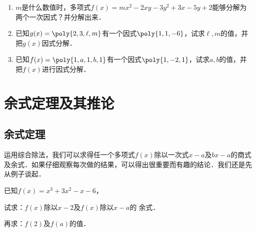 \begin{enumerate}
    \begin{enumerate}
    \item $x^2+3xy+2y^2+4x+5y+3$
\end{enumerate}
    \item $m$是什么数值时，多项式$f(x)=mx^2-2xy-3y^2+3x-5y+2$能够分解为两个一次因式？并分解出来．
    \item 已知$g(x)=\poly{2,3,\ell,m}$有一个因式$\poly{1,1,-6}$，试求$\ell,m$的值，并把$g(x)$因式分解．
    \item 已知$f(x)=\poly{1,a,1,b,1}$有一个因式$\poly{1,-2,1}$，试求$a,b$的值，并把$f(x)$进行因式分解．
\end{enumerate}

\section{余式定理及其推论}
\subsection{余式定理}
运用综合除法，我们可以求得任一个多项式$f(x)$除以一次式$x-a$及$bx-a$的商式及余式．如果仔细观察每次做的结果，可以得出很重要而有趣的结论．我们还是先从例子谈起．

\begin{example}
已知$f(x)=x^3+3x^2-x-6$，

    试求：$f(x)$除以$x-2$及$f(x)$除以$x-a$的
    余式．

    再求：$f(2)$及$f(a)$的值．
\end{example}

